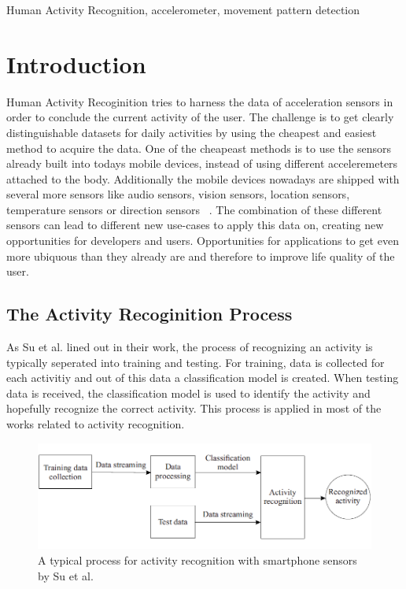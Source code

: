 \documentclass[conference]{IEEEtran}
\begin{document}
\begin{IEEEkeywords}
Human Activity Recognition, accelerometer, movement pattern detection
\end{IEEEkeywords}

\section{Introduction}
Human Activity Recoginition tries to harness the data of acceleration sensors in order to conclude the current activity of the user. The challenge is to get clearly distinguishable datasets for daily activities by using the cheapest and easiest method to acquire the data.
One of the cheapeast methods is to use the sensors already built into todays mobile devices, instead of using different acceleremeters attached to the body. Additionally the mobile devices nowadays are shipped with several more sensors like audio sensors, vision sensors, location sensors, temperature sensors or direction sensors ~\cite{Kwapisz2011}. The combination of these different sensors can lead to different new use-cases to apply this data on, creating new opportunities for developers and users. Opportunities for applications to get even more ubiquous than they already are and therefore to improve life quality of the user.
\newpage
\subsection{The Activity Recoginition Process}
As Su et al. lined out in their work, the process of recognizing an activity is typically seperated into training and testing. For training, data is collected for each activitiy and out of this data a classification model is created. When testing data is received, the classification model is used to identify the activity and hopefully recognize the correct activity. This process is applied in most of the works related to activity recognition.
\begin{figure}[!htb]
\includegraphics[width=\linewidth]{recognition_process}
  \caption{A typical process for activity recognition with smartphone sensors by Su et al. ~\cite{Su2014} }
  \label{fig:recognition_process}
\end{figure}
\end{document}
